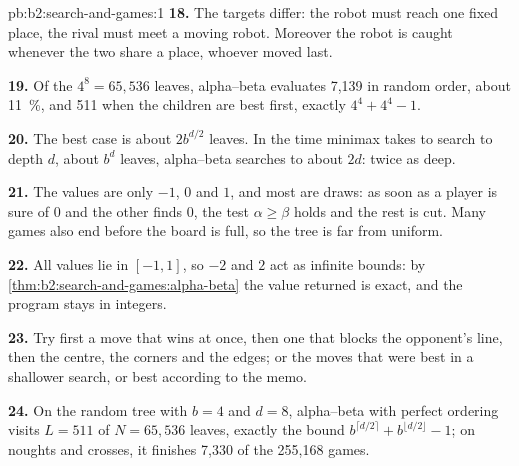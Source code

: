 \begin{solution}{pb:b2:search-and-games:1}
\textbf{18.} The targets differ: the robot must reach one fixed place, the rival must meet a moving robot. Moreover the
robot is caught whenever the two share a place, whoever moved last.

\textbf{19.} Of the $4^8 = 65{,}536$ leaves, alpha--beta evaluates 7,139 in random order, about 11~\%, and 511 when the
children are best first, exactly $4^4 + 4^4 - 1$.

\textbf{20.} The best case is about $2b^{d/2}$ leaves. In the time minimax takes to search to depth $d$, about $b^d$
leaves, alpha--beta searches to about $2d$: twice as deep.

\textbf{21.} The values are only $-1$, $0$ and $1$, and most are draws: as soon as a player is sure of $0$ and the other
finds $0$, the test $\alpha \geq \beta$ holds and the rest is cut. Many games also end before the board is full, so the
tree is far from uniform.

\textbf{22.} All values lie in $[-1, 1]$, so $-2$ and $2$ act as infinite bounds: by \cref{thm:b2:search-and-games:alpha-beta}
the value returned is exact, and the program stays in integers.

\textbf{23.} Try first a move that wins at once, then one that blocks the opponent's line, then the centre, the corners and
the edges; or the moves that were best in a shallower search, or best according to the memo.

\textbf{24.} On the random tree with $b = 4$ and $d = 8$, alpha--beta with perfect ordering visits $L = 511$ of $N =
65{,}536$ leaves, exactly the bound $b^{\lceil d/2 \rceil} + b^{\lfloor d/2 \rfloor} - 1$; on noughts and crosses, it
finishes 7,330 of the 255,168 games.
\end{solution}
